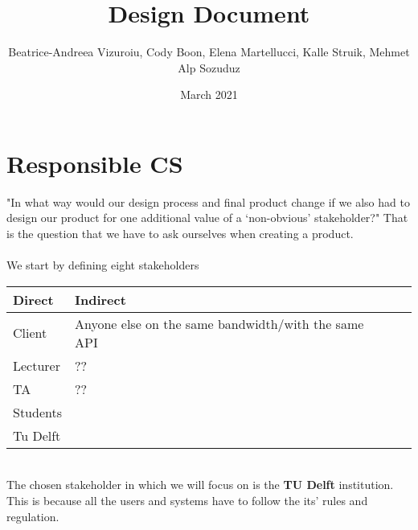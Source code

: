 \documentclass{article}
\title{Design Document}
\author{Beatrice-Andreea Vizuroiu, Cody Boon, Elena Martellucci, Kalle Struik, Mehmet Alp Sozuduz }
\date{March 2021}
\begin{document}
\maketitle

\section{Responsible CS}
"In what way would our design process and final product change if we also had to design our product for one additional value of a ‘non-obvious’ stakeholder?" That is the question that we have to ask ourselves when creating a product.\\
\\We start by defining eight stakeholders\\
\begin{center}
    \begin{tabular}{ | l | l | l | l | l |}
    \hline
    Direct    & Indirect \\ \hline \hline
    Client  & Anyone else on the same bandwidth/with the same API  \\ \hline
    Lecturer  &??  \\ \hline
    TA  &??  \\ \hline
    Students  &   \\ \hline
    Tu Delft  &   \\ \hline
    \end{tabular}
\end{center}

\\ The chosen stakeholder in which we will focus on is the \textbf{TU Delft} institution. This is because all the users and systems have to follow the its' rules and regulation. \\
\end{document}
